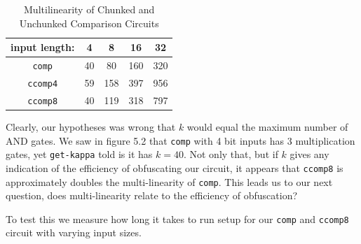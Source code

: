 \documentclass[12pt,twoside]{reedthesis}
\begin{document}
 
 \begin{table}[htbp] %
\caption[Multilinearity of Different Comparison Circuits]{Multilinearity of Chunked and Unchunked Comparison Circuits} 
\begin{center} 
\begin{tabular}{c c c c c} 
\toprule %
  input length: &4 & 8 & 16 &32 \\ %
  \midrule %
	\texttt{comp} &40 &80 &160 &320\\
	\texttt{ccomp4} &59 &158 &397 &956 \\
	\texttt{ccomp8} &40 &119 &318 &797 \\
		\bottomrule %
\end{tabular}
\end{center}
\label{inheritance} %
\end{table}

\par Clearly, our hypotheses was wrong that $k$ would equal the maximum number of AND gates. We saw in figure 5.2 that \texttt{comp} with 4 bit inputs has 3 multiplication gates, yet \texttt{get-kappa} told is it has $k=40$. Not only that, but if $k$ gives any indication of the efficiency of obfuscating our circuit, it appears that \texttt{ccomp8} is approximately doubles the multi-linearity of \texttt{comp}. This leads us to our next question, does multi-linearity relate to the efficiency of obfuscation?
\par To test this we measure how long it takes to run setup for our \texttt{comp} and \texttt{ccomp8} circuit with varying input sizes.
\end{document}
